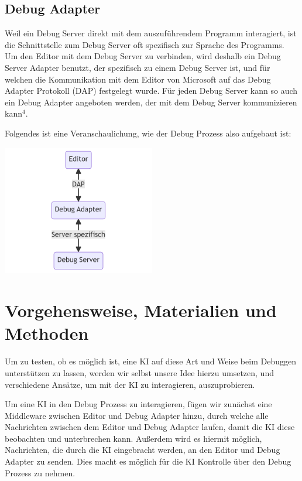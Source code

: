 \documentclass[a4paper,12pt,ngerman]{scrartcl}
\begin{document}
\subsection{Debug Adapter}

Weil ein Debug Server direkt mit dem auszuführendem Programm interagiert, ist die Schnittstelle zum Debug Server oft spezifisch zur Sprache des Programms. Um den Editor mit dem Debug Server zu verbinden, wird deshalb ein Debug Server Adapter benutzt, der spezifisch zu einem Debug Server ist, und für welchen die Kommunikation mit dem Editor von Microsoft auf das Debug Adapter Protokoll (DAP) festgelegt wurde. Für jeden Debug Server kann so auch ein Debug Adapter angeboten werden, der mit dem Debug Server kommunizieren kann$^4$.

Folgendes ist eine Veranschaulichung, wie der Debug Prozess also aufgebaut ist:

\begin{center}
	\includegraphics[width=0.5\textwidth]{debugger}
\end{center}

\section{Vorgehensweise, Materialien und Methoden}

Um zu testen, ob es möglich ist, eine KI auf diese Art und Weise beim Debuggen unterstützen zu lassen, werden wir selbst unsere Idee hierzu umsetzen, und verschiedene Ansätze, um mit der KI zu interagieren, auszuprobieren.

Um eine KI in den Debug Prozess zu interagieren, fügen wir zunächst eine Middleware zwischen Editor und Debug Adapter hinzu, durch welche alle Nachrichten zwischen dem Editor und Debug Adapter laufen, damit die KI diese beobachten und unterbrechen kann. Außerdem wird es hiermit möglich, Nachrichten, die durch die KI eingebracht werden, an den Editor und Debug Adapter zu senden. Dies macht es möglich für die KI Kontrolle über den Debug Prozess zu nehmen.
\end{document}
